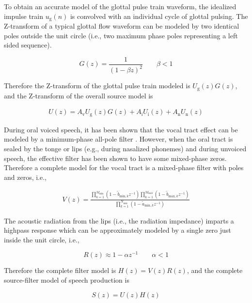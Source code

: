 To obtain an accurate model of the glottal pulse train waveform, the idealized impulse train $u_\mathrm{g}(n)$ is convolved with an individual cycle of glottal pulsing. The Z-transform of a typical glottal flow waveform can be modeled by two identical poles outside the unit circle (i.e., two maximum phase poles representing a left sided sequence).

\begin{equation}
	G(z)=\frac{1}{(1-\beta z)^2} \qquad \beta<1 \label{eq:glottal_pulse_z}
\end{equation}


Therefore the Z-transform of the glottal pulse train modeled is $U_\mathrm{g}(z)G(z)$, and the Z-transform of the overall source model is

\begin{eqnarray}
	U(z)=A_\mathrm{v} U_\mathrm{g}(z) G(z)+A_\mathrm{i} U_\mathrm{i}(z)+A_\mathrm{n} U_\mathrm{n}(z)
\end{eqnarray}

During oral voiced speech, it has been shown that the vocal tract effect can be modeled by a minimum-phase all-pole filter \citep{atal1971speech}. However, when the oral tract is sealed by the tonge or lips (e.g., during nasalized phonemes) and during unvoiced speech, the effective filter has been shown to have some mixed-phase zeros. Therefore a complete model for the vocal tract is a mixed-phase filter with poles and zeros, i.e.,

\begin{eqnarray}
	V(z)=
	\frac
	{\prod_{k=1}^{M_{\mathrm{min}}}(1-\tilde{b}_{\mathrm{min},k}z^{-1}) 
		\prod_{k=1}^{M_{\mathrm{max}}}(1-\tilde{b}_{\mathrm{max},k}z^{-1})}
	{\prod_{k=1}^{N_{\mathrm{min}}}(1-\tilde{a}_{\mathrm{min},k} z^{-1})}
\end{eqnarray}

The acoustic radiation from the lips (i.e., the radiation impedance) imparts a highpass response which can be approximately modeled by a single zero just inside the unit circle, i.e.,

\begin{equation}
	R(z)\approx 1-\alpha z^{-1} \qquad \alpha <1
\end{equation}

Therefore the complete filter model is $H(z)=V(z)R(z)$, and the complete source-filter model of speech production is

\begin{equation}
	S(z)=U(z)H(z)
\end{equation}

